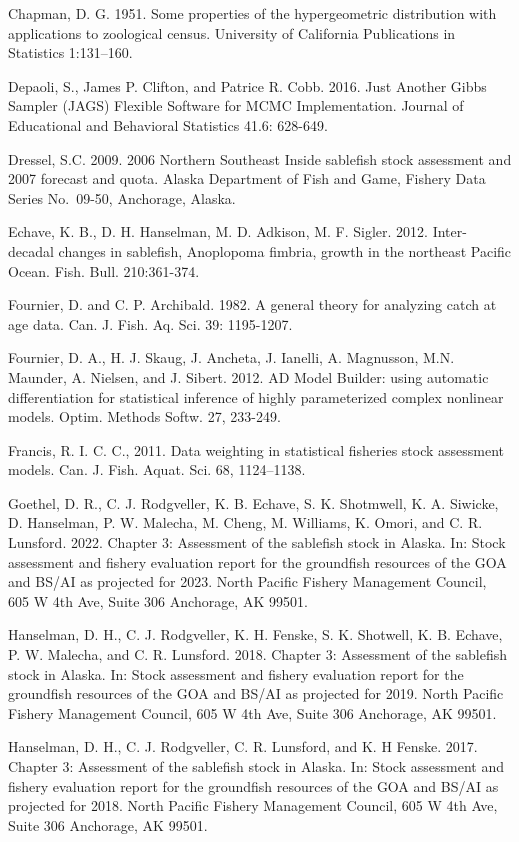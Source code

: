 \documentclass[
]{article}
\begin{document}
Chapman, D. G. 1951. Some properties of the hypergeometric distribution with applications to zoological census. University of California Publications in Statistics 1:131--160.

Depaoli, S., James P. Clifton, and Patrice R. Cobb. 2016. Just Another Gibbs Sampler (JAGS) Flexible Software for MCMC Implementation. Journal of Educational and Behavioral Statistics 41.6: 628-649.

Dressel, S.C. 2009. 2006 Northern Southeast Inside sablefish stock assessment and 2007 forecast and quota. Alaska Department of Fish and Game, Fishery Data Series No.~09-50, Anchorage, Alaska.

Echave, K. B., D. H. Hanselman, M. D. Adkison, M. F. Sigler. 2012. Inter-decadal changes in sablefish, Anoplopoma fimbria, growth in the northeast Pacific Ocean. Fish. Bull. 210:361-374.

Fournier, D. and C. P. Archibald. 1982. A general theory for analyzing catch at age data. Can. J. Fish. Aq. Sci. 39: 1195-1207.

Fournier, D. A., H. J. Skaug, J. Ancheta, J. Ianelli, A. Magnusson, M.N. Maunder, A. Nielsen, and J. Sibert. 2012. AD Model Builder: using automatic differentiation for statistical inference of highly parameterized complex nonlinear models. Optim. Methods Softw. 27, 233-249.

Francis, R. I. C. C., 2011. Data weighting in statistical fisheries stock assessment models. Can. J. Fish. Aquat. Sci. 68, 1124--1138.

Goethel, D. R., C. J. Rodgveller, K. B. Echave, S. K. Shotmwell, K. A. Siwicke, D. Hanselman, P. W. Malecha, M. Cheng, M. Williams, K. Omori, and C. R. Lunsford. 2022. Chapter 3: Assessment of the sablefish stock in Alaska. In: Stock assessment and fishery evaluation report for the groundfish resources of the GOA and BS/AI as projected for 2023. North Pacific Fishery Management Council, 605 W 4th Ave, Suite 306 Anchorage, AK 99501.

Hanselman, D. H., C. J. Rodgveller, K. H. Fenske, S. K. Shotwell, K. B. Echave, P. W. Malecha, and C. R. Lunsford. 2018. Chapter 3: Assessment of the sablefish stock in Alaska. In: Stock assessment and fishery evaluation report for the groundfish resources of the GOA and BS/AI as projected for 2019. North Pacific Fishery Management Council, 605 W 4th Ave, Suite 306 Anchorage, AK 99501.

Hanselman, D. H., C. J. Rodgveller, C. R. Lunsford, and K. H Fenske. 2017. Chapter 3: Assessment of the sablefish stock in Alaska. In: Stock assessment and fishery evaluation report for the groundfish resources of the GOA and BS/AI as projected for 2018. North Pacific Fishery Management Council, 605 W 4th Ave, Suite 306 Anchorage, AK 99501.
\end{document}

